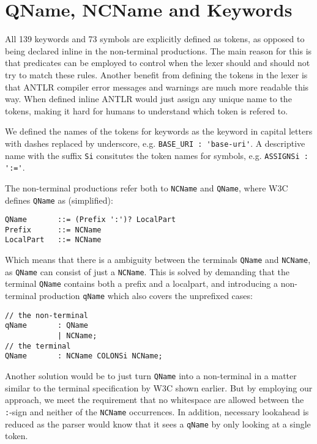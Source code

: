 \section{QName, NCName and Keywords}
\label{sect:rewritegrammar:keywordNCName}

All 139 keywords and 73 symbols are explicitly defined as tokens, as opposed to being declared inline in the non-terminal productions. The main reason for this is that predicates can be employed to control when the lexer should and should not try to match these rules. Another benefit from defining the tokens in the lexer is that ANTLR compiler error messages and warnings are much more readable this way. When defined inline ANTLR would just assign any unique name to the tokens, making it hard for humans to understand which token is refered to. 

We defined the names of the tokens for keywords as the keyword in capital letters with dashes replaced by underscore, e.g. \verb!BASE_URI : 'base-uri'!. A descriptive name with the suffix \verb!Si! consitutes the token names for symbols, e.g. \verb!ASSIGNSi : ':='!.

The non-terminal productions refer both to \verb!NCName! and \verb!QName!, where W3C defines \verb!QName! as (simplified):
\begin{Verbatim}
QName       ::= (Prefix ':')? LocalPart
Prefix      ::= NCName
LocalPart   ::= NCName
\end{Verbatim}

Which means that there is a ambiguity between the terminals \verb!QName! and \verb!NCName!, as \verb!QName! can consist of just a \verb!NCName!. This is solved by demanding that the terminal \verb!QName! contains both a prefix and a localpart, and introducing a non-terminal production \verb!qName! which also covers the unprefixed cases:
\begin{Verbatim}
// the non-terminal
qName       : QName
            | NCName;
// the terminal
QName       : NCName COLONSi NCName;
\end{Verbatim}

Another solution would be to just turn \verb!QName! into a non-terminal in a matter similar to the terminal specification by W3C shown earlier. But by employing our approach, we meet the requirement that no whitespace are allowed between the \verb!:!-sign and neither of the \verb!NCName! occurrences. In addition, necessary lookahead is reduced as the parser would know that it sees a \verb!qName! by only looking at a single token.

